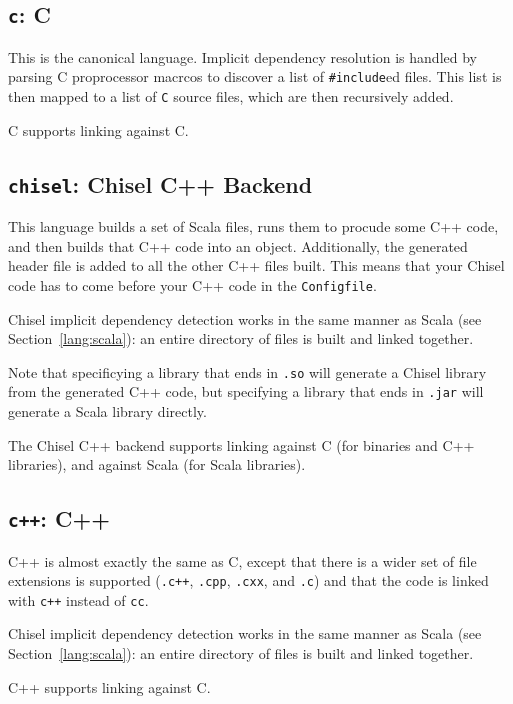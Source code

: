 \documentclass{article}
\begin{document}
\subsection{\texttt{c}: C \label{lang:c}}

This is the canonical language.  Implicit dependency resolution is
handled by parsing C proprocessor macrcos to discover a list of
\texttt{\#include}ed files.  This list is then mapped to a list of
\texttt{C} source files, which are then recursively added.

C supports linking against C.

\subsection{\texttt{chisel}: Chisel C++ Backend \label{chisel}}

This language builds a set of Scala files, runs them to procude some
C++ code, and then builds that C++ code into an object.  Additionally,
the generated header file is added to all the other C++ files built.
This means that your Chisel code has to come before your C++ code in
the \texttt{Configfile}.

Chisel implicit dependency detection works in the same manner as Scala
(see Section~\ref{lang:scala}): an entire directory of files is built
and linked together.

Note that specificying a library that ends in \texttt{.so} will
generate a Chisel library from the generated C++ code, but specifying
a library that ends in \texttt{.jar} will generate a Scala library
directly.

The Chisel C++ backend supports linking against C (for binaries and
C++ libraries), and against Scala (for Scala libraries).

\subsection{\texttt{c++}: C++}

C++ is almost exactly the same as C, except that there is a wider set
of file extensions is supported (\texttt{.c++}, \texttt{.cpp},
\texttt{.cxx}, and \texttt{.c}) and that the code is linked with
\texttt{c++} instead of \texttt{cc}.

Chisel implicit dependency detection works in the same manner as Scala
(see Section~\ref{lang:scala}): an entire directory of files is built
and linked together.

C++ supports linking against C.
\end{document}
